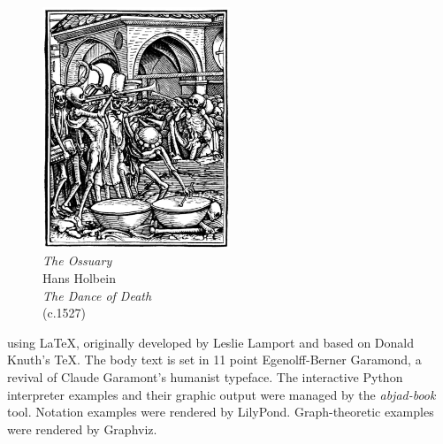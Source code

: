 \newpage

\begin{figure}
    \vspace{50pt}
    \centering
    \includegraphics[width=0.5\textwidth]{assets/holbein-ossuary.jpg}
    \\
    \emph{The Ossuary}
    \\
    Hans Holbein
    \\
    \emph{The Dance of Death}
    \\
    (c.1527)
\end{figure}

\begin{center}

\parbox{220pt}{

 using \LaTeX, originally
developed by Leslie Lamport and based on Donald Knuth's \TeX. The body text is
set in 11 point Egenolff-Berner Garamond, a revival of Claude Garamont's
humanist typeface. The interactive Python interpreter examples and their
graphic output were managed by the \emph{abjad-book} tool. Notation examples
were rendered by LilyPond. Graph-theoretic examples were rendered by Graphviz.

}

\end{center}